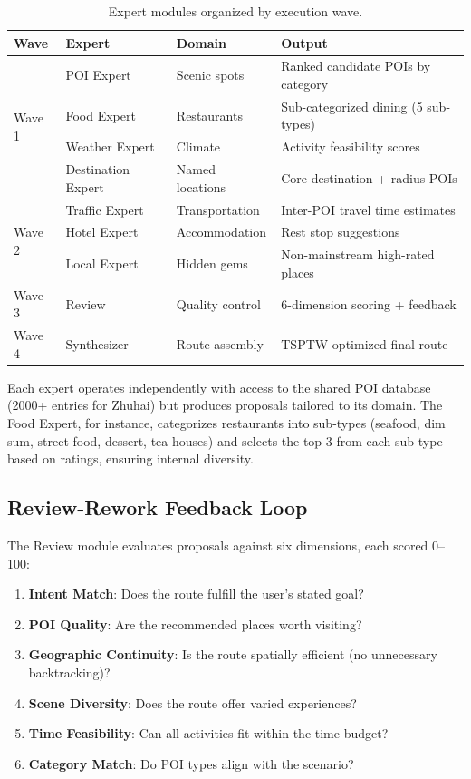 \documentclass[11pt]{article}
\begin{document}
\begin{table}[h]
\centering
\caption{Expert modules organized by execution wave.}
\label{tab:experts}
\begin{tabular}{@{}llll@{}}
\toprule
\textbf{Wave} & \textbf{Expert} & \textbf{Domain} & \textbf{Output} \\
\midrule
\multirow{4}{*}{Wave 1} & POI Expert & Scenic spots & Ranked candidate POIs by category \\
 & Food Expert & Restaurants & Sub-categorized dining (5 sub-types) \\
 & Weather Expert & Climate & Activity feasibility scores \\
 & Destination Expert & Named locations & Core destination + radius POIs \\
\midrule
\multirow{3}{*}{Wave 2} & Traffic Expert & Transportation & Inter-POI travel time estimates \\
 & Hotel Expert & Accommodation & Rest stop suggestions \\
 & Local Expert & Hidden gems & Non-mainstream high-rated places \\
\midrule
Wave 3 & Review & Quality control & 6-dimension scoring + feedback \\
Wave 4 & Synthesizer & Route assembly & TSPTW-optimized final route \\
\bottomrule
\end{tabular}
\end{table}

Each expert operates independently with access to the shared POI database (2000+ entries for Zhuhai) but produces proposals tailored to its domain. The Food Expert, for instance, categorizes restaurants into sub-types (seafood, dim sum, street food, dessert, tea houses) and selects the top-3 from each sub-type based on ratings, ensuring internal diversity.

\subsection{Review-Rework Feedback Loop}

The Review module evaluates proposals against six dimensions, each scored 0--100:

\begin{enumerate}[leftmargin=*]
    \item \textbf{Intent Match}: Does the route fulfill the user's stated goal?
    \item \textbf{POI Quality}: Are the recommended places worth visiting?
    \item \textbf{Geographic Continuity}: Is the route spatially efficient (no unnecessary backtracking)?
    \item \textbf{Scene Diversity}: Does the route offer varied experiences?
    \item \textbf{Time Feasibility}: Can all activities fit within the time budget?
    \item \textbf{Category Match}: Do POI types align with the scenario?
\end{enumerate}
\end{document}
